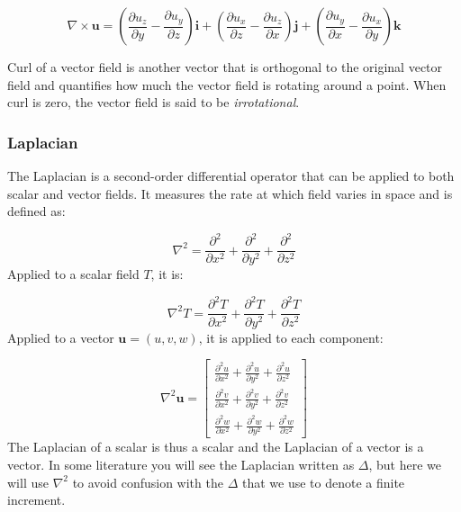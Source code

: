 \documentclass[12pt]{article}
\numberwithin{equation}{section}
\numberwithin{figure}{section}
\numberwithin{table}{section}
\begin{document}
\begin{equation}
  \nabla \times \mathbf{u} = \left( \frac{\partial u_z}{\partial y} -
    \frac{\partial u_y}{\partial z} \right) \mathbf{i} +
    \left( \frac{\partial u_x}{\partial z} -
    \frac{\partial u_z}{\partial x} \right) \mathbf{j} +
    \left( \frac{\partial u_y}{\partial x} -
    \frac{\partial u_x}{\partial y} \right) \mathbf{k}
\end{equation}

Curl of a vector field is another vector that is orthogonal to the original
vector field and quantifies how much the vector field is rotating around a
point.
When curl is zero, the vector field is said to be \textit{irrotational}.

\subsubsection{Laplacian}

The Laplacian is a second-order differential operator that
can be applied to both scalar and vector fields.
It measures the rate at which field varies in space and is defined as:

\begin{equation}
  \nabla^2 = \frac{\partial^2}{\partial x^2} + \frac{\partial^2}{\partial y^2} + \frac{\partial^2}{\partial z^2}
\end{equation}
Applied to a scalar field $T$, it is:

\begin{equation}
  \nabla^2 T = \frac{\partial^2 T}{\partial x^2} + \frac{\partial^2 T}{\partial y^2} + \frac{\partial^2 T}{\partial z^2}
\end{equation}
Applied to a vector $\mathbf{u} = (u, v, w)$, it is applied to each component:

\begin{equation}
  \nabla^2 \mathbf{u} = \begin{bmatrix}
    \frac{\partial^2 u}{\partial x^2} + \frac{\partial^2 u}{\partial y^2} + \frac{\partial^2 u}{\partial z^2} \\
    \frac{\partial^2 v}{\partial x^2} + \frac{\partial^2 v}{\partial y^2} + \frac{\partial^2 v}{\partial z^2} \\
    \frac{\partial^2 w}{\partial x^2} + \frac{\partial^2 w}{\partial y^2} + \frac{\partial^2 w}{\partial z^2}
  \end{bmatrix}
\end{equation}
The Laplacian of a scalar is thus a scalar and the Laplacian of a vector is a
vector.
In some literature you will see the Laplacian written as $\Delta$, but here we
will use $\nabla^2$ to avoid confusion with the $\Delta$ that we use to denote
a finite increment.
\end{document}
